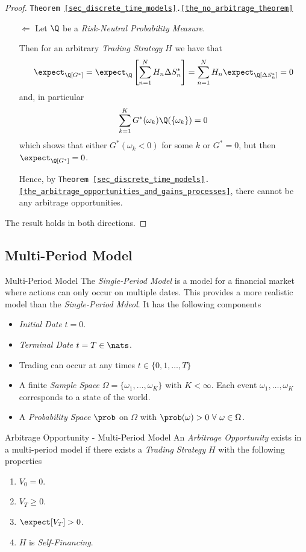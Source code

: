 \documentclass[11pt,a4paper]{article}
\begin{document}
\begin{proof}{\texttt{Theorem \ref{sec_discrete_time_models}.\ref{the_no_arbitrage_theorem}}}
\begin{itemize}
      \item[$\Leftarrow$] Let $\Q$ be a \textit{Risk-Neutral Probability Measure}.
      \par Then for an arbitrary \textit{Trading Strategy} $H$ we have that
      \[ \expect_\Q[G^*]=\expect_\Q\left[\sum_{n=1}^NH_n\Delta S_n^*\right]=\sum_{n=1}^NH_n\expect_\Q[\Delta S_n^*]=0 \]
      and, in particular
      \[ \sum_{k=1}^KG^*(\omega_k)\Q(\{\omega_k\})=0 \]
      which shows that either $G^*(\omega_k<0)$ for some $k$ or $G^*=0$, but then $\expect_\Q[G^*]=0$.
      \par Hence, by \texttt{Theorem \ref{sec_discrete_time_models}.\ref{the_arbitrage_opportunities_and_gains_processes}}, there cannot be any arbitrage opportunities.
    \end{itemize}
    The result holds in both directions.\proved
  \end{proof}

\subsection{Multi-Period Model}

  \begin{definition}{Multi-Period Model}
    The \textit{Single-Period Model} is a model for a financial market where actions can only occur on multiple dates. This provides a more realistic model than the \textit{Single-Period Mdeol}. It has the following components
    \begin{itemize}
      \item \textit{Initial Date} $t=0$.
      \item \textit{Terminal Date} $t=T\in\nats$.
      \item Trading can occur at any times $t\in\{0,1,\dots,T\}$
      \item A finite \textit{Sample Space} $\Omega=\{\omega_1,\dots,\omega_K\}$ with $K<\infty$. Each event $\omega_1,\dots,\omega_K$ corresponds to a state of the world.
      \item A \textit{Probability Space} $\prob$ on $\Omega$ with $\prob(\omega)>0\ \forall\ \omega\in\Omega$.
    \end{itemize}
  \end{definition}

  \begin{definition}{Arbitrage Opportunity - Multi-Period Model}
    An \textit{Arbitrage Opportunity} exists in a multi-period model if there exists a \textit{Trading Strategy} $H$ with the following properties
    \begin{enumerate}
      \item $V_0=0$.
      \item $V_T\geq0$.
      \item $\expect[V_T]>0$.
      \item $H$ is \textit{Self-Financing}.
    \end{enumerate}
  \end{definition}
\end{document}

